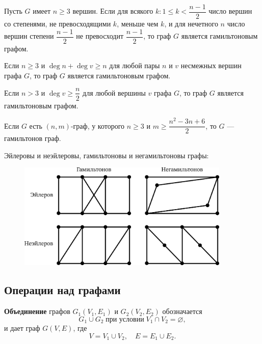 \begin{theorem*}
    Пусть \(G\) имеет \(n \geq 3\) вершин. Если для всякого \(k: 1 \leq k < \dfrac{n - 1}{2}\) число вершин со степенями, не превосходящими \(k\), меньше чем \(k\), и для нечетного \(n\) число вершин степени \(\dfrac{n - 1}{2}\) не превосходит \(\dfrac{n - 1}{2}\), то граф \(G\) является гамильтоновым графом.
    \begin{consequence}
        Если \(n \geq 3\) и \(\deg n + \deg v \geq n\) для любой пары \(n\) и \(v\) несмежных вершин графа \(G\), то граф \(G\) является гамильтоновым графом.
    \end{consequence}
    \begin{consequence}
        Если \(n > 3\) и \(\deg v \geq \dfrac{n}{2}\) для любой вершины \(v\) графа \(G\), то граф \(G\) является гамильтоновым графом.
    \end{consequence}
\end{theorem*}

\begin{theorem*}
    Если \(G\) есть \((n, m)\)-граф, у которого \(n \geq 3\) и \(m \geq \dfrac{n^2 - 3n + 6}{2}\), то \(G\) --- гамильтонов граф.
\end{theorem*}

\begin{example*}
    Эйлеровы и неэйлеровы, гамильтоновы и негамильтоновы графы:
    \begin{figure}[H]
        \centering
        \includegraphics[width=0.9\textwidth]{images/hamiltonian-euler-example.png}
    \end{figure}
\end{example*}

\subsection{Операции над графами}

\textbf{Объединение} графов \(G_1 (V_1, E_1)\) и \(G_2 (V_2, E_2)\) обозначается
\[
    G_1 \cup G_2
    \; \text{при условии} \;
    V_1 \cap V_2 = \varnothing,
\]
и дает граф \(G (V, E)\), где
\[
    V = V_1 \cup V_2,
    \quad
    E = E_1 \cup E_2.
\]

